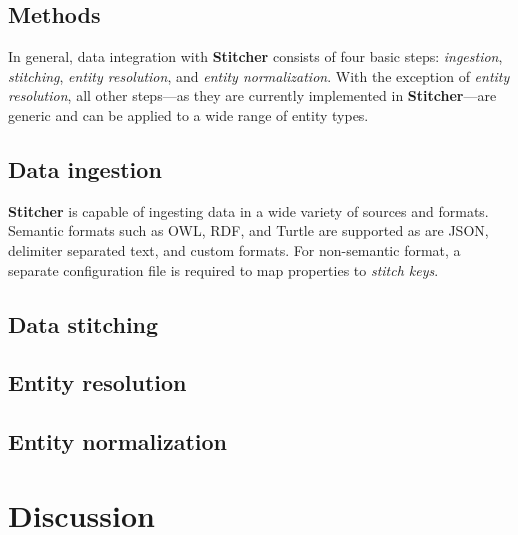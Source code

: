 \documentclass{bioinfo}
\newcommand\st{\textbf{Stitcher}}
\begin{document}
\begin{methods}
\section{Methods}\label{sec:methods}
In general, data integration with \st{} consists of four basic steps: \emph{ingestion}, \emph{stitching}, \emph{entity resolution}, and \emph{entity normalization}. With the exception of \emph{entity resolution}, all other steps---as they are currently implemented in \st---are generic and can be applied to a wide range of entity types.

\subsection{Data ingestion}
\st{} is capable of ingesting data in a wide variety of sources and formats. Semantic formats such as OWL, RDF, and Turtle are supported as are JSON, delimiter separated text, and custom formats. For non-semantic format, a separate configuration file is required to map properties to \emph{stitch keys}.

\subsection{Data stitching}

\subsection{Entity resolution}\label{sec:methods_er}

\subsection{Entity normalization}



\end{methods}



\section{Discussion}


%
%
\end{document}

